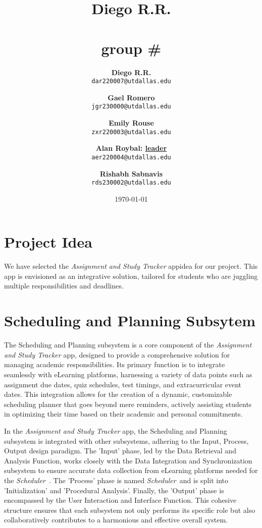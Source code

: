\documentclass[12pt]{article}
\title{
    \textbf{Diego R.R.} \\
    \groupname \\
    \small{group} \# \groupnumber \\
}
\author{
    \textbf{Diego R.R.} \\
    \texttt{dar220007@utdallas.edu} \\
    \and 
    \textbf{Gael Romero} \\
    \texttt{jgr230000@utdallas.edu} \\
    \and
    \textbf{Emily Rouse} \\
    \texttt{zxr220003@utdallas.edu} \\
    \and
    \textbf{Alan Roybal: \underline{leader}} \\
    \texttt{aer220004@utdallas.edu} \\
    \and
    \textbf{Rishabh Sabnavis} \\
    \texttt{rds230002@utdallas.edu}
}
\date{\today} %
\newcommand\app{\textit{Assignment and Study Tracker} app}
\begin{document}
\maketitle %

\section{Project Idea} 
    We have selected the \app idea for our project. This app is envisioned as an integrative solution, tailored for students who are juggling multiple responsibilities and deadlines.

\section{Scheduling and Planning Subsytem}
    The Scheduling and Planning subsystem is a core component of the \app, designed to provide a comprehensive solution for managing academic responsibilities. Its primary function is to integrate seamlessly with eLearning platforms, harnessing a variety of data points such as assignment due dates, quiz schedules, test timings, and extracurricular event dates. This integration allows for the creation of a dynamic, customizable scheduling planner that goes beyond mere reminders, actively assisting students in optimizing their time based on their academic and personal commitments.

\newcommand\scheduler{\textit{Scheduler\ }}
    In the \app, the Scheduling and Planning subsystem is integrated with other subsystems, adhering to the Input, Process, Output design paradigm. The 'Input' phase, led by the Data Retrieval and Analysis Function, works closely with the Data Integration and Synchronization subsystem to ensure accurate data collection from eLearning platforms needed for the \scheduler. The 'Process' phase is named \scheduler and is split into 'Initialization' and 'Procedural Analysis'. Finally, the 'Output' phase is encompassed by the User Interaction and Interface Function. This cohesive structure ensures that each subsystem not only performs its specific role but also collaboratively contributes to a harmonious and effective overall system.
\end{document}
